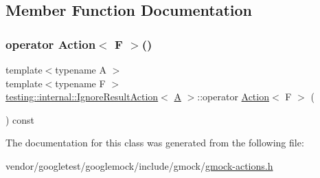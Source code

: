 \subsection{Member Function Documentation}
\mbox{\label{classtesting_1_1internal_1_1_ignore_result_action_affb8b7439604c860e1416f45339c6e37}} 
\subsubsection{\texorpdfstring{operator Action$<$ F $>$()}{operator Action< F >()}}
{\footnotesize\ttfamily template$<$typename A $>$ \\
template$<$typename F $>$ \\
\hyperlink{classtesting_1_1internal_1_1_ignore_result_action}{testing\+::internal\+::\+Ignore\+Result\+Action}$<$ \hyperlink{namespacetesting_a5e9134d655d2fc9323902348083282e7}{A} $>$\+::operator \hyperlink{classtesting_1_1_action}{Action}$<$ F $>$ (\begin{DoxyParamCaption}{ }\end{DoxyParamCaption}) const\hspace{0.3cm}{\ttfamily [inline]}}



The documentation for this class was generated from the following file\+:\begin{DoxyCompactItemize}
\item 
vendor/googletest/googlemock/include/gmock/\hyperlink{gmock-actions_8h}{gmock-\/actions.\+h}\end{DoxyCompactItemize}
